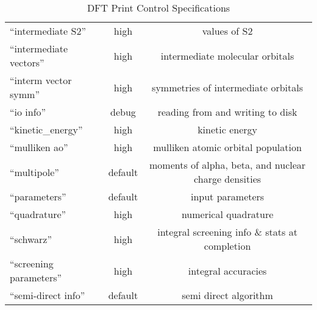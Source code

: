 \begin{table}[htbp]
\begin{center}
\begin{tabular}{lcc}
 ``intermediate S2''                & high        & values of S2 \\
 ``intermediate vectors''           & high        & intermediate molecular orbitals \\
 ``interm vector symm''             & high        & symmetries of intermediate orbitals \\
 ``io info''                        & debug       & reading from and writing to disk  \\
 ``kinetic\_energy''                & high        & kinetic energy \\
 ``mulliken ao''                    & high        & mulliken atomic orbital population \\

 ``multipole''                      & default     & moments of alpha, beta, and nuclear charge densities \\
 ``parameters''                     & default     & input parameters \\
 ``quadrature''                     & high        & numerical quadrature  \\
 ``schwarz''                        & high        & integral screening info \& stats at completion\\
 ``screening parameters''           & high        & integral accuracies \\
 ``semi-direct info''               & default     & semi direct algorithm \\
\end{tabular}
\end{center}
\caption{DFT Print Control Specifications}
\end{table}




